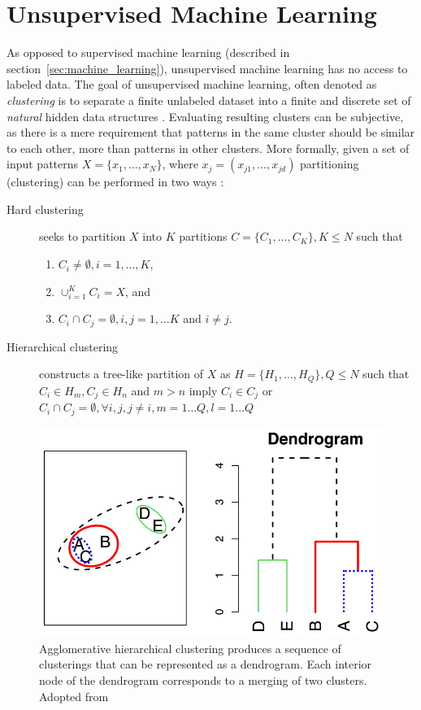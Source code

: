 \section{Unsupervised Machine Learning}
\label{sec:unsupervised_machine_learning}

As opposed to supervised machine learning (described in
section~\ref{sec:machine_learning}), unsupervised machine learning
has no access to labeled data. The goal of unsupervised machine learning,
often denoted as \textit{clustering} is to separate 
a finite unlabeled dataset into a finite and discrete set of 
\textit{natural} hidden data structures \citep{xu2005survey}.
Evaluating resulting clusters can be subjective, as there is a mere 
requirement that patterns in the same cluster should be similar to each
other, more than patterns in other clusters. More formally, 
given a set of input patterns $X = \{x_1, \dots, x_N\}$, where
$x_j = (x_{j1}, \dots, x_{jd})$ partitioning (clustering) can 
be performed in two ways \citep{xu2005survey}:
\begin{description}
\item[Hard clustering] seeks to partition $X$ into $K$ partitions $C=\{C_1, \dots, C_K\}, K \leq N$
	such that 
	\begin{enumerate}
	\item $C_i \neq \emptyset, i = 1, \dots, K$, 
	\item $\cup_{i=1}^{K} C_i = X$, and
	\item $C_i \cap C_j = \emptyset , i, j = 1, \dots K$ and $i \neq j$.
	\end{enumerate}
\item[Hierarchical clustering] constructs a tree-like partition of $X$ as 
	$H = \{H_1, \dots, H_Q\}, Q \leq N$ such that
	$C_i \in H_m, C_j \in H_n$ and $m > n$
	imply $C_i \in C_j$ or $C_i \cap C_j = \emptyset, \forall i, j, j \neq
		i, m = 1 \dots Q, l = 1 \dots Q$
\end{description}

\begin{figure}
	\includegraphics{clustering_linkage.jpg}
	\caption{
		Agglomerative hierarchical clustering produces a sequence of
		clusterings that can be represented as a dendrogram. Each
		interior node of the dendrogram corresponds to a merging of two
		clusters. Adopted from \citep{bien2011hierarchical}
	}

	\label{fig:clustering}
\end{figure}

